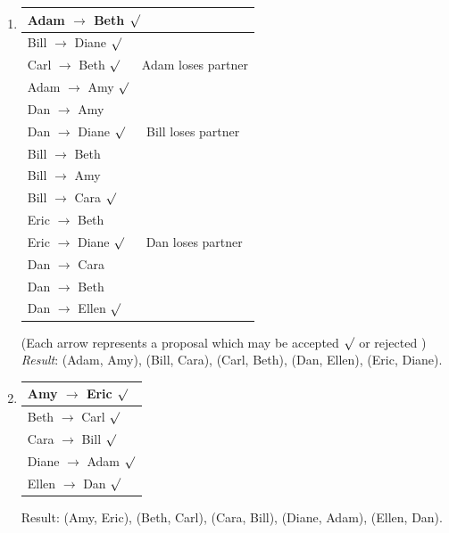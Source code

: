 \documentclass{scrartcl}
\begin{document}
\begin{enumerate}
		\item\phantom{phantom}
		\begin{center}
			\begin{tabular}{|l|}
				\hline
				Adam $\to$ Beth $\surd$\\\hline
				Bill $\to$ Diane $\surd$\\\hline
				Carl $\to$ Beth $\surd$ $\quad$ Adam loses partner\\\hline
				Adam $\to$ Amy $\surd$\\\hline
				Dan $\to$ Amy \lightning\\\hline
				Dan $\to$ Diane $\surd$ $\quad$ Bill loses partner\\\hline
				Bill $\to$ Beth \lightning\\\hline
				Bill $\to$ Amy \lightning\\\hline
				Bill $\to$ Cara $\surd$\\\hline
				Eric $\to$ Beth \lightning\\\hline
				Eric $\to$ Diane $\surd$ $\quad$ Dan loses partner\\\hline
				Dan $\to$ Cara \lightning\\\hline
				Dan $\to$ Beth \lightning\\\hline
				Dan $\to$ Ellen $\surd$\\
				\hline
			\end{tabular}
		\end{center}
		(Each arrow represents a proposal which may be accepted $\surd$ or rejected \lightning)\\
		\textit{Result}: (Adam, Amy), (Bill, Cara), (Carl, Beth), (Dan, Ellen), (Eric, Diane).
		
		\item\phantom{phantom}
		\begin{center}
			\begin{tabular}{|l|}
				\hline
				Amy $\to$ Eric $\surd$\\\hline
				Beth $\to$ Carl $\surd$\\\hline
				Cara $\to$ Bill $\surd$\\\hline
				Diane $\to$ Adam $\surd$\\\hline
				Ellen $\to$ Dan $\surd$\\
				\hline
			\end{tabular}
		\end{center}
	Result: (Amy, Eric), (Beth, Carl), (Cara, Bill), (Diane, Adam), (Ellen, Dan).
		
	\end{enumerate}
	\newpage
\end{document}
